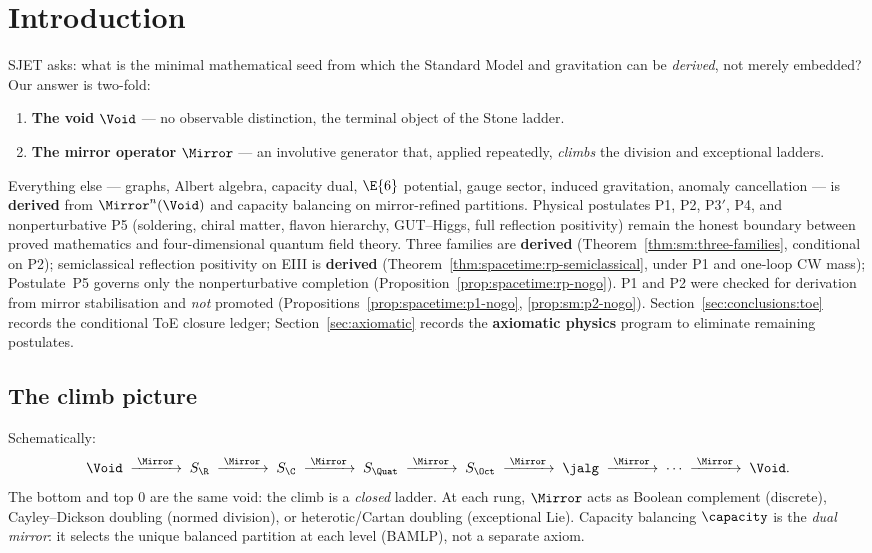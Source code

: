 \section{Introduction}
\label{sec:intro}

SJET asks: what is the minimal mathematical seed from which the Standard Model
and gravitation can be \emph{derived}, not merely embedded? Our answer is
two-fold:
\begin{enumerate}[label=\textbf{Axiom \arabic*},leftmargin=*]
  \item \textbf{The void} $\Void$ --- no observable distinction, the terminal
    object of the Stone ladder.
  \item \textbf{The mirror operator} $\Mirror$ --- an involutive generator that,
    applied repeatedly, \emph{climbs} the division and exceptional ladders.
\end{enumerate}
Everything else --- graphs, Albert algebra, capacity dual, $\E{6}$ potential,
gauge sector, induced gravitation, anomaly cancellation --- is \textbf{derived}
from $\Mirror^n(\Void)$ and capacity balancing on mirror-refined partitions.
Physical postulates P1, P2, P3$'$, P4, and nonperturbative P5 (soldering,
chiral matter, flavon hierarchy, GUT--Higgs, full reflection positivity)
remain the honest boundary between proved mathematics and four-dimensional
quantum field theory. Three families are \textbf{derived}
(Theorem~\ref{thm:sm:three-families}, conditional on P2); semiclassical
reflection positivity on EIII is \textbf{derived}
(Theorem~\ref{thm:spacetime:rp-semiclassical}, under P1 and one-loop CW mass);
Postulate~P5 governs only the nonperturbative completion
(Proposition~\ref{prop:spacetime:rp-nogo}). P1 and P2 were checked for
derivation from mirror stabilisation and \emph{not} promoted
(Propositions~\ref{prop:spacetime:p1-nogo}, \ref{prop:sm:p2-nogo}).
Section~\ref{sec:conclusions:toe} records the conditional ToE closure ledger;
Section~\ref{sec:axiomatic} records the \textbf{axiomatic physics} program to
eliminate remaining postulates.

\subsection{The climb picture}
\label{sec:intro:climb}

Schematically:
\begin{equation}\label{eq:intro:climb}
  \Void
  \;\xrightarrow{\;\Mirror\;}\;
  S_{\R}\;\xrightarrow{\;\Mirror\;}\;S_{\C}\;\xrightarrow{\;\Mirror\;}\;
  S_{\Quat}\;\xrightarrow{\;\Mirror\;}\;S_{\Oct}\;\xrightarrow{\;\Mirror\;}\;
  \jalg
  \;\xrightarrow{\;\Mirror\;}\;
  \cdots\;\xrightarrow{\;\Mirror\;}\;\Void.
\end{equation}
The bottom and top $0$ are the same void: the climb is a \emph{closed} ladder.
At each rung, $\Mirror$ acts as Boolean complement (discrete), Cayley--Dickson
doubling (normed division), or heterotic/Cartan doubling (exceptional Lie).
Capacity balancing $\capacity$ is the \emph{dual mirror}: it selects the unique
balanced partition at each level (BAMLP), not a separate axiom.

